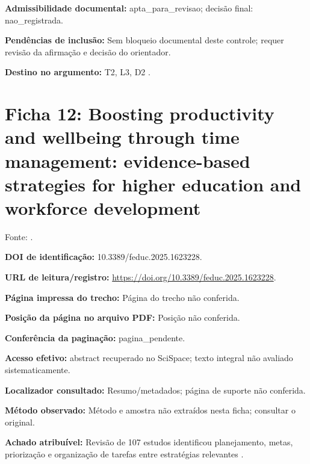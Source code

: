 \noindent\textbf{Admissibilidade documental:} apta\_para\_revisao; decisão final: nao\_registrada.\par\medskip

\noindent\textbf{Pendências de inclusão:} Sem bloqueio documental deste controle; requer revisão da afirmação e decisão do orientador.\par\medskip

\noindent\textbf{Destino no argumento:} T2, L3, D2 .

\clearpage\section*{Ficha 12: Boosting productivity and wellbeing through time management: evidence-based strategies for higher education and workforce development}

Fonte: \citet{education_patzak2025}.

\noindent\textbf{DOI de identificação:} 10.3389/feduc.2025.1623228.\par\medskip

\noindent\textbf{URL de leitura/registro:} \url{https://doi.org/10.3389/feduc.2025.1623228}.\par\medskip

\noindent\textbf{Página impressa do trecho:} Página do trecho não conferida.\par\medskip

\noindent\textbf{Posição da página no arquivo PDF:} Posição não conferida.\par\medskip

\noindent\textbf{Conferência da paginação:} pagina\_pendente.\par\medskip

\noindent\textbf{Acesso efetivo:} abstract recuperado no SciSpace; texto integral não avaliado sistematicamente.\par\medskip

\noindent\textbf{Localizador consultado:} Resumo/metadados; página de suporte não conferida.\par\medskip

\noindent\textbf{Método observado:} Método e amostra não extraídos nesta ficha; consultar o original.\par\medskip

\noindent\textbf{Achado atribuível:} Revisão de 107 estudos identificou planejamento, metas, priorização e organização de tarefas entre estratégias relevantes \citep{education_patzak2025}.\par\medskip

